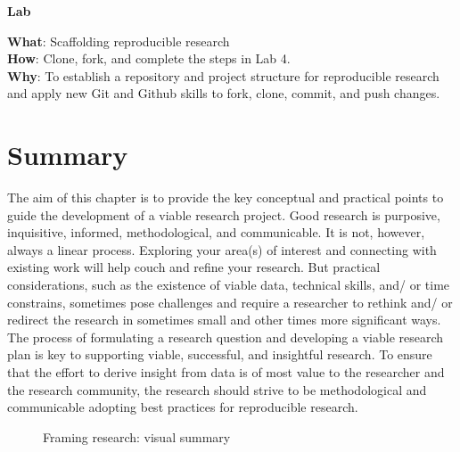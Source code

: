 \documentclass[
  letterpaper,
]{latex/krantz}
\theoremstyle{definition}
\theoremstyle{remark}
\begin{document}
\begin{tcolorbox}[enhanced jigsaw, breakable, leftrule=.75mm, arc=.35mm, colframe=quarto-callout-color-frame, colback=white, left=2mm, bottomrule=.15mm, rightrule=.15mm, toprule=.15mm, opacityback=0]

\textbf{ Lab}

\textbf{What}: Scaffolding reproducible research\\
\textbf{How}: Clone, fork, and complete the steps in Lab 4.\\
\textbf{Why}: To establish a repository and project structure for
reproducible research and apply new Git and Github skills to fork,
clone, commit, and push changes.

\end{tcolorbox}

\section*{Summary}\label{summary-3}


The aim of this chapter is to provide the key conceptual and practical
points to guide the development of a viable research project. Good
research is purposive, inquisitive, informed, methodological, and
communicable. It is not, however, always a linear process. Exploring
your area(s) of interest and connecting with existing work will help
couch and refine your research. But practical considerations, such as
the existence of viable data, technical skills, and/ or time constrains,
sometimes pose challenges and require a researcher to rethink and/ or
redirect the research in sometimes small and other times more
significant ways. The process of formulating a research question and
developing a viable research plan is key to supporting viable,
successful, and insightful research. To ensure that the effort to derive
insight from data is of most value to the researcher and the research
community, the research should strive to be methodological and
communicable adopting best practices for reproducible research.

\begin{figure}[H]


\caption{\label{fig-fr-visual-summary}Framing research: visual summary}

\end{figure}%
\end{document}
